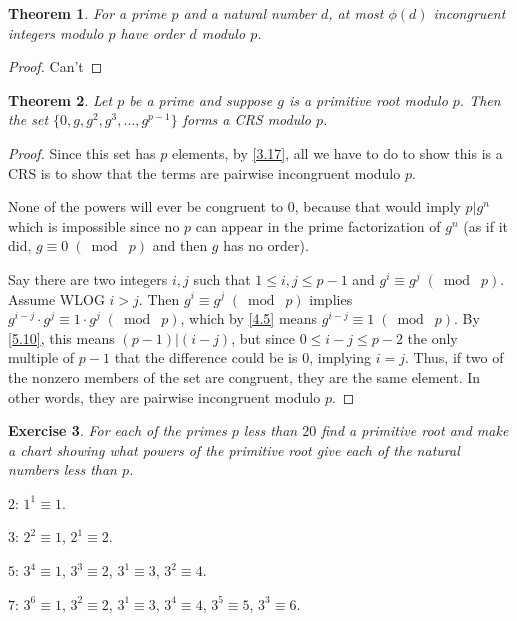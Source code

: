 \documentclass{article}
\newtheorem{thm}{Theorem}[section]
\newtheorem{ex}[thm]{Exercise}
\numberwithin{equation}{thm}
\providecommand{\gmod}[1]{\; (\bmod \; #1)}
\begin{document}
\begin{thm} \label{6.5}
  For a prime $p$ and a natural number $d$, at most $\phi (d)$ incongruent integers modulo $p$ have order $d$ modulo $p$.
\end{thm}

\begin{proof}
  Can't
\end{proof}



\begin{thm} \label{6.6}
  Let $p$ be a prime and suppose $g$ is a primitive root modulo $p$. Then the set $\{0, g, g^2, g^3, \ldots, g^{p-1}\}$ forms a CRS modulo $p$.
\end{thm}

\begin{proof}
  Since this set has $p$ elements, by \ref{3.17}, all we have to do to show this is a CRS is to show that the terms are pairwise incongruent modulo $p$.

  None of the powers will ever be congruent to $0$, because that would imply $p | g^n$ which is impossible since no $p$ can appear in the prime factorization of $g^n$ (as if it did, $g \equiv 0 \gmod p$ and then $g$ has no order).

  Say there are two integers $i, j$ such that $1 \leq i, j \leq p-1$ and $g^i \equiv g^j \gmod p$. Assume WLOG $i > j$. Then $g^i \equiv g^j \gmod p$ implies $g^{i-j} \cdot g^j \equiv 1 \cdot g^j \gmod p$, which by \ref{4.5} means $g^{i-j} \equiv 1 \gmod p$.
  By \ref{5.10}, this means $(p-1) | (i - j)$, but since $0 \leq i - j \leq p-2$ the only multiple of $p-1$ that the difference could be is $0$, implying $i = j$. Thus, if two of the nonzero members of the set are congruent, they are the same element. In other words, they are pairwise incongruent modulo $p$.
\end{proof}



\begin{ex} \label{6.7}
  For each of the primes $p$ less than $20$ find a primitive root and make a chart showing what powers of the primitive root give each of the natural numbers less than $p$.
\end{ex}

$2$: $1^1 \equiv 1$.

$3$: $2^2 \equiv 1$, $2^1 \equiv 2$.

$5$: $3^4 \equiv 1$, $3^3 \equiv 2$, $3^1 \equiv 3$, $3^2 \equiv 4$.

$7$: $3^6 \equiv 1$, $3^2 \equiv 2$, $3^1 \equiv 3$, $3^4 \equiv 4$, $3^5 \equiv 5$, $3^3 \equiv 6$.
\end{document}
